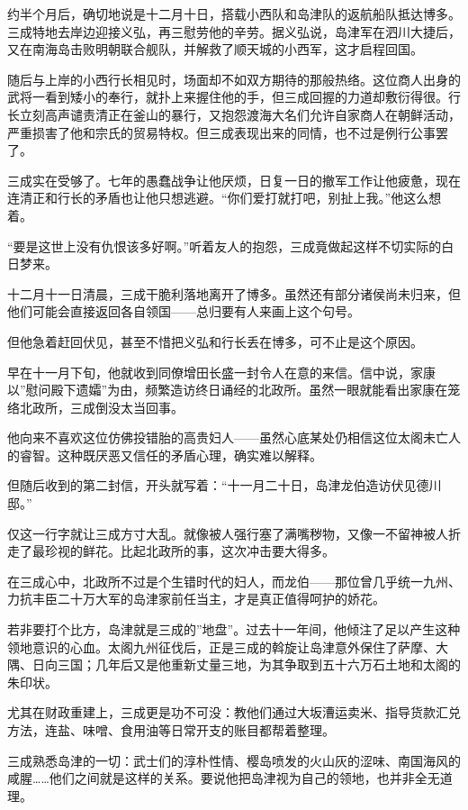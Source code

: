 \documentclass[
]{article}
\begin{document}
约半个月后，确切地说是十二月十日，搭载小西队和岛津队的返航船队抵达博多。三成特地去岸边迎接义弘，再三慰劳他的辛劳。据义弘说，岛津军在泗川大捷后，又在南海岛击败明朝联合舰队，并解救了顺天城的小西军，这才启程回国。

随后与上岸的小西行长相见时，场面却不如双方期待的那般热络。这位商人出身的武将一看到矮小的奉行，就扑上来握住他的手，但三成回握的力道却敷衍得很。行长立刻高声谴责清正在釜山的暴行，又抱怨渡海大名们允许自家商人在朝鲜活动，严重损害了他和宗氏的贸易特权。但三成表现出来的同情，也不过是例行公事罢了。

三成实在受够了。七年的愚蠢战争让他厌烦，日复一日的撤军工作让他疲惫，现在连清正和行长的矛盾也让他只想逃避。``你们爱打就打吧，别扯上我。''他这么想着。

``要是这世上没有仇恨该多好啊。''听着友人的抱怨，三成竟做起这样不切实际的白日梦来。

十二月十一日清晨，三成干脆利落地离开了博多。虽然还有部分诸侯尚未归来，但他们可能会直接返回各自领国------总归要有人来画上这个句号。

但他急着赶回伏见，甚至不惜把义弘和行长丢在博多，可不止是这个原因。

早在十一月下旬，他就收到同僚增田长盛一封令人在意的来信。信中说，家康以''慰问殿下遗孀''为由，频繁造访终日诵经的北政所。虽然一眼就能看出家康在笼络北政所，三成倒没太当回事。

他向来不喜欢这位仿佛投错胎的高贵妇人------虽然心底某处仍相信这位太阁未亡人的睿智。这种既厌恶又信任的矛盾心理，确实难以解释。

但随后收到的第二封信，开头就写着：``十一月二十日，岛津龙伯造访伏见德川邸。''

仅这一行字就让三成方寸大乱。就像被人强行塞了满嘴秽物，又像一不留神被人折走了最珍视的鲜花。比起北政所的事，这次冲击要大得多。

在三成心中，北政所不过是个生错时代的妇人，而龙伯------那位曾几乎统一九州、力抗丰臣二十万大军的岛津家前任当主，才是真正值得呵护的娇花。

若非要打个比方，岛津就是三成的''地盘''。过去十一年间，他倾注了足以产生这种领地意识的心血。太阁九州征伐后，正是三成的斡旋让岛津意外保住了萨摩、大隅、日向三国；几年后又是他重新丈量三地，为其争取到五十六万石土地和太阁的朱印状。

尤其在财政重建上，三成更是功不可没：教他们通过大坂漕运卖米、指导货款汇兑方法，连盐、味噌、食用油等日常开支的账目都帮着整理。

三成熟悉岛津的一切：武士们的淳朴性情、樱岛喷发的火山灰的涩味、南国海风的咸腥\ldots\ldots 他们之间就是这样的关系。要说他把岛津视为自己的领地，也并非全无道理。
\end{document}
